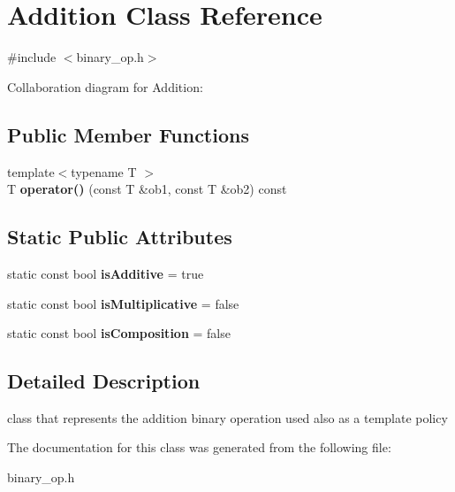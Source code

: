 \hypertarget{classAddition}{\section{Addition Class Reference}
\label{classAddition}
}


{\ttfamily \#include $<$binary\-\_\-op.\-h$>$}



Collaboration diagram for Addition\-:
\subsection*{Public Member Functions}
\begin{DoxyCompactItemize}
\item 
\hypertarget{classAddition_a0cd0e60cd506c9e640d89422303d77b7}{{\footnotesize template$<$typename T $>$ }\\T {\bfseries operator()} (const T \&ob1, const T \&ob2) const }\label{classAddition_a0cd0e60cd506c9e640d89422303d77b7}

\end{DoxyCompactItemize}
\subsection*{Static Public Attributes}
\begin{DoxyCompactItemize}
\item 
\hypertarget{classAddition_a24b52cf787fbb2997cca7fabd26feb9b}{static const bool {\bfseries is\-Additive} = true}\label{classAddition_a24b52cf787fbb2997cca7fabd26feb9b}

\item 
\hypertarget{classAddition_a5e060aac1855b53aa87849ea9e439cd9}{static const bool {\bfseries is\-Multiplicative} = false}\label{classAddition_a5e060aac1855b53aa87849ea9e439cd9}

\item 
\hypertarget{classAddition_a7fce2d48cdd7335298e138775b9fde7b}{static const bool {\bfseries is\-Composition} = false}\label{classAddition_a7fce2d48cdd7335298e138775b9fde7b}

\end{DoxyCompactItemize}


\subsection{Detailed Description}
class that represents the addition binary operation used also as a template policy 

The documentation for this class was generated from the following file\-:\begin{DoxyCompactItemize}
\item 
binary\-\_\-op.\-h\end{DoxyCompactItemize}
